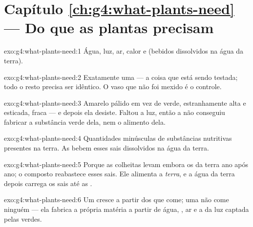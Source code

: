 \section*{Capítulo \ref{ch:g4:what-plants-need} --- Do que as plantas precisam}

\begin{solution}{exo:g4:what-plants-need:1}
Água, luz, ar, calor e  (bebidos dissolvidos na água da
terra).
\end{solution}

\begin{solution}{exo:g4:what-plants-need:2}
Exatamente uma --- a coisa que está sendo testada; todo o resto
precisa ser idêntico. O vaso que não foi mexido é o controle.
\end{solution}

\begin{solution}{exo:g4:what-plants-need:3}
Amarelo pálido em vez de verde, estranhamente alta e esticada, fraca
--- e depois ela desiste. Faltou a luz, então a  não conseguiu
fabricar a substância verde dela, nem o alimento dela.
\end{solution}

\begin{solution}{exo:g4:what-plants-need:4}
Quantidades minúsculas de substâncias nutritivas presentes na terra.
As  bebem esses sais dissolvidos na água da terra.
\end{solution}

\begin{solution}{exo:g4:what-plants-need:5}
Porque as colheitas levam embora os  da terra ano após
ano; o composto reabastece esses sais. Ele alimenta a \emph{terra},
e a água da terra depois carrega os sais até as .
\end{solution}

\begin{solution}{exo:g4:what-plants-need:6}
Um  cresce a partir dos  que come; uma  não
come ninguém --- ela fabrica a própria matéria a partir de água,
, ar e a  da luz captada pelas  verdes.
\end{solution}

